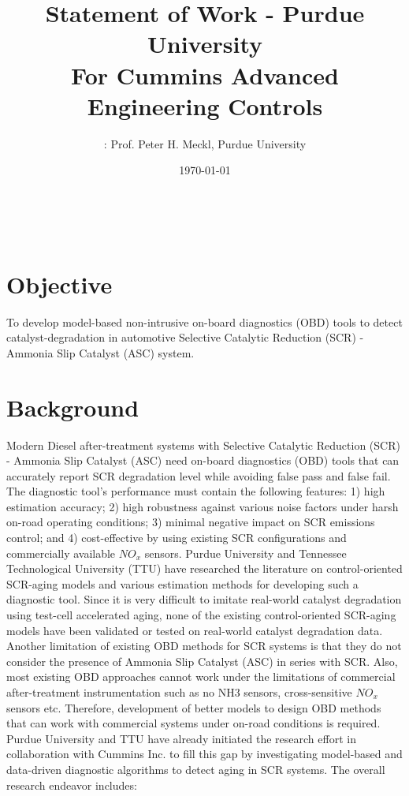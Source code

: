 \documentclass[letterpaper, 11pt]{article}
\title{Statement of Work - Purdue University \\ For Cummins Advanced Engineering Controls}
\author{
\itbf{Principal Investigator}: Prof. Peter H. Meckl, Purdue University}
\date{\today}
\begin{document}
\maketitle
\tableofcontents
\newpage
\
\newpage

\section{Objective}
To develop model-based non-intrusive on-board diagnostics (OBD) tools to detect
catalyst-degradation in automotive Selective Catalytic Reduction (SCR) - Ammonia
Slip Catalyst (ASC) system.

\section{Background}
Modern Diesel after-treatment systems with Selective Catalytic Reduction (SCR)
- Ammonia Slip Catalyst (ASC) need on-board diagnostics (OBD) tools that can
accurately report SCR degradation level while avoiding false pass and false
fail. The diagnostic tool's performance must contain the following features: 1)
high estimation accuracy; 2) high robustness against various noise factors
under harsh on-road operating conditions; 3) minimal negative impact on SCR
emissions control; and 4) cost-effective by using existing SCR configurations
and commercially available $NO_x$ sensors. Purdue University and Tennessee
Technological University (TTU) have researched the literature on
control-oriented SCR-aging models and various estimation methods for developing
such a diagnostic tool. Since it is very difficult to imitate real-world
catalyst degradation using test-cell accelerated aging, none of the existing
control-oriented SCR-aging models have been validated or tested on real-world
catalyst degradation data. Another limitation of existing OBD methods for SCR
systems is that they do not consider the presence of Ammonia Slip Catalyst
(ASC) in series with SCR. Also, most existing OBD approaches cannot work under
the limitations of commercial after-treatment instrumentation such as no NH3
sensors, cross-sensitive $NO_x$ sensors etc. Therefore, development of better
models to design OBD methods that can work with commercial systems under
on-road conditions is required. Purdue University and TTU have already
initiated the research effort in collaboration with Cummins Inc. to fill this
gap by investigating model-based and data-driven diagnostic algorithms to
detect aging in SCR systems. The overall research endeavor includes:
\end{document}
